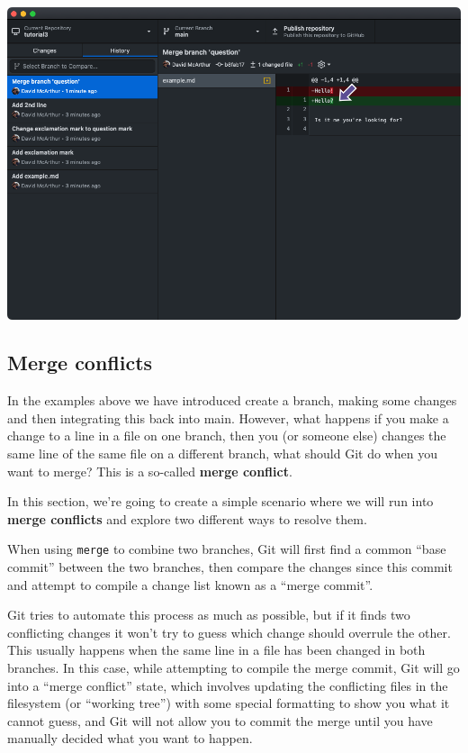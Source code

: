 \documentclass[
  letterpaper,
  DIV=11,
  numbers=noendperiod]{scrartcl}
\begin{document}
\includegraphics{images/image45.png}

\hypertarget{merge-conflicts}{%
\subsection{Merge conflicts}\label{merge-conflicts}}

In the examples above we have introduced create a branch, making some
changes and then integrating this back into main. However, what happens
if you make a change to a line in a file on one branch, then you (or
someone else) changes the same line of the same file on a different
branch, what should Git do when you want to merge? This is a so-called
\textbf{merge conflict}.

In this section, we're going to create a simple scenario where we will
run into \textbf{merge conflicts} and explore two different ways to
resolve them.

When using \texttt{merge} to combine two branches, Git will first find a
common ``base commit'' between the two branches, then compare the
changes since this commit and attempt to compile a change list known as
a ``merge commit''.

Git tries to automate this process as much as possible, but if it finds
two conflicting changes it won't try to guess which change should
overrule the other. This usually happens when the same line in a file
has been changed in both branches. In this case, while attempting to
compile the merge commit, Git will go into a ``merge conflict'' state,
which involves updating the conflicting files in the filesystem (or
``working tree'') with some special formatting to show you what it
cannot guess, and Git will not allow you to commit the merge until you
have manually decided what you want to happen.
\end{document}

